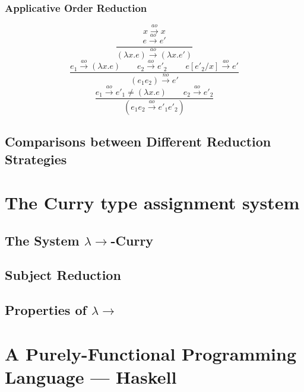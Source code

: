 \documentclass[a4paper,11pt,twoside]{report}
\begin{document}
\subsection{Applicative Order Reduction}

\begin{equation*}
x \xrightarrow{ao}x
\end{equation*}
\begin{equation*}
\frac{e \xrightarrow{ao}e'}{(\lambda x.e) \xrightarrow{ao} (\lambda x.e')}
\end{equation*}
\begin{equation*}
\frac{e_1 \xrightarrow{ao} (\lambda x.e)\ \ \ \ \ \ \ \ \ e_2\xrightarrow{ao} e'_2\ \ \ \ \ \ \ \ \ \ e[e'_2/x] \xrightarrow{ao} e'}{(e_1e_2) \xrightarrow{no} e'}
\end{equation*}
\begin{equation*}
\frac{e_1 \xrightarrow{ao} e'_1\neq (\lambda x.e)\ \ \ \ \ \ \ \ \ e_2 \xrightarrow{ao} e'_2}{(e_1e_2 \xrightarrow{ao}e'_1e'_2)}
\end{equation*}


\section{Comparisons between Different Reduction Strategies }






\chapter{The Curry type assignment system}

\section{The System $\lambda \rightarrow $-Curry}
\section{Subject Reduction}
\section{Properties of $\lambda \rightarrow $}

\chapter{A Purely-Functional Programming Language --- Haskell}
\end{document}
